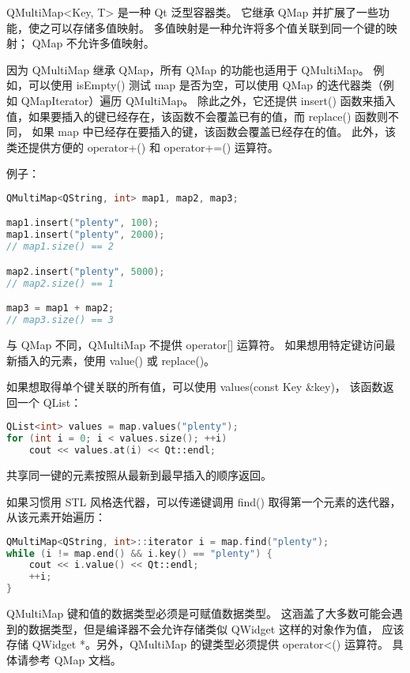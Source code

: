QMultiMap<Key, T> 是一种 Qt 泛型容器类。
它继承 QMap 并扩展了一些功能，使之可以存储多值映射。
多值映射是一种允许将多个值关联到同一个键的映射；
QMap 不允许多值映射。

因为 QMultiMap 继承 QMap，所有 QMap 的功能也适用于 QMultiMap。
例如，可以使用 isEmpty() 测试 map 是否为空，可以使用 QMap 的迭代器类（例如 QMapIterator）遍历 QMultiMap。
除此之外，它还提供 insert() 函数来插入值，如果要插入的键已经存在，该函数不会覆盖已有的值，而 replace() 函数则不同，
如果 map 中已经存在要插入的键，该函数会覆盖已经存在的值。
此外，该类还提供方便的 operator+() 和 operator+=() 运算符。

例子：

\begin{lstlisting}[language=C++]
QMultiMap<QString, int> map1, map2, map3;

map1.insert("plenty", 100);
map1.insert("plenty", 2000);
// map1.size() == 2

map2.insert("plenty", 5000);
// map2.size() == 1

map3 = map1 + map2;
// map3.size() == 3
\end{lstlisting}


与 QMap 不同，QMultiMap 不提供 operator[] 运算符。
如果想用特定键访问最新插入的元素，使用 value() 或 replace()。

如果想取得单个键关联的所有值，可以使用 values(const Key \&key)，
该函数返回一个 QList：

\begin{lstlisting}[language=C++]
QList<int> values = map.values("plenty");
for (int i = 0; i < values.size(); ++i)
    cout << values.at(i) << Qt::endl;
\end{lstlisting}

共享同一键的元素按照从最新到最早插入的顺序返回。

如果习惯用 STL 风格迭代器，可以传递键调用 find() 取得第一个元素的迭代器，从该元素开始遍历：

\begin{lstlisting}[language=C++]
QMultiMap<QString, int>::iterator i = map.find("plenty");
while (i != map.end() && i.key() == "plenty") {
    cout << i.value() << Qt::endl;
    ++i;
}
\end{lstlisting}

QMultiMap 键和值的数据类型必须是可赋值数据类型。
这涵盖了大多数可能会遇到的数据类型，但是编译器不会允许存储类似 QWidget 这样的对象作为值，
应该存储 QWidget *。另外，QMultiMap 的键类型必须提供 operator<() 运算符。 
具体请参考 QMap 文档。

